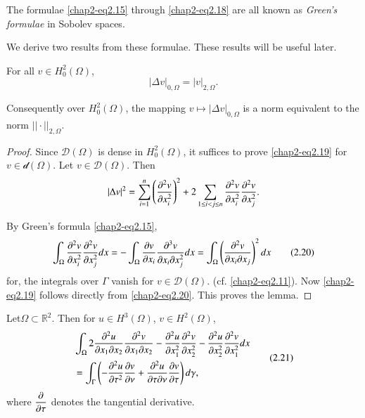 The formulae \eqref{chap2-eq2.15} through \eqref{chap2-eq2.18} are all
known as {\em Green's formulae} in Sobolev spaces.

We derive two results from these formulae. These results will be
useful later.

\begin{lemma}\label{chap2-lem2.1}
For all $v\in H^{2}_{0}(\Omega)$,
\begin{equation*}
|\Delta v|_{0,\Omega}=|v|_{2,\Omega}.\tag{2.19}\label{chap2-eq2.19}
\end{equation*}

Consequently over $H^{2}_{0}(\Omega)$, the mapping $v\mapsto |\Delta
v|_{0,\Omega}$ is a norm equivalent to the norm $||\cdot ||_{2,\Omega}$.
\end{lemma}

\begin{proof}
Since $\mathscr{D}(\Omega)$ is dense in $H^{2}_{0}(\Omega)$, it
suffices to prove \eqref{chap2-eq2.19} for
$v\in\mathscr{d}(\Omega)$. Let $v\in\mathscr{D}(\Omega)$. Then
$$
|\Delta v|^{2}=\sum^{n}_{i=1}\left(\frac{\partial^{2}v}{\partial
  x^{2}_{i}}\right)^{2}+2\sum_{1\leq i<j\leq n}\frac{\partial^{2}v}{\partial
  x^{2}_{i}}\frac{\partial^{2}v}{\partial x^{2}_{j}}. 
$$

By Green's formula \eqref{chap2-eq2.15},
\begin{equation*}
\int_{\Omega}\frac{\partial^{2}v}{\partial x^{2}_{i}}\frac{\partial^{2}v}{\partial
  x^{2}_{j}}dx=-\int_{\Omega} \frac{\partial v}{\partial x_{i}}\frac{\partial^{3}v}{\partial
  x_{i}\partial x^{2}_{j}}dx=\int_{\Omega}\left(\frac{\partial^{2}v}{\partial x_{i}\partial
  x_{j}}\right)^{2}dx\tag{2.20}\label{chap2-eq2.20} 
\end{equation*}
for, the integrals over $\Gamma$ vanish for
$v\in\mathscr{D}(\Omega)$. (cf. \eqref{chap2-eq2.11}). Now
\eqref{chap2-eq2.19} follows directly from \eqref{chap2-eq2.20}. This
proves the lemma.
\end{proof}

\begin{lemma}\label{chap2-lem2.2}
Let\pageoriginale $\Omega\subset\mathbb{R}^{2}$. Then for $u\in H^{3}(\Omega)$,
$v\in H^{2}(\Omega)$,
\begin{equation*}
\begin{split}
& \int_{\Omega}2\frac{\partial^{2}u}{\partial x_{1}\partial x_{2}}\frac{\partial^{2}v}{\partial
  x_{1}\partial x_{2}}-\frac{\partial^{2}u}{\partial x^{2}_{1}}\frac{\partial^{2}v}{\partial
  x^{2}_{2}}-\frac{\partial^{2}u}{\partial x^{2}_{2}}\frac{\partial^{2}v}{\partial
  x^{2}_{1}}dx\\
& =\int_{\Gamma}\left(-\frac{\partial^{2}u}{\partial \tau^{2}}\frac{\partial v}{\partial
    \nu}+\frac{\partial^{2}u}{\partial \tau \partial \nu}\frac{\partial v}{\partial \tau}\right)d\gamma,
\end{split}\tag{2.21}\label{chap2-eq2.21} 
\end{equation*}
where $\dfrac{\partial}{\partial \tau}$ denotes the tangential derivative.
\end{lemma}

